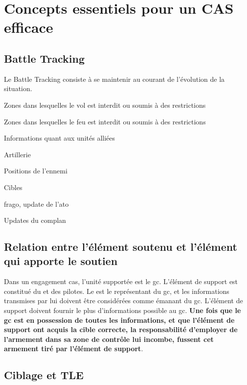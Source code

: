 \newpage
\section{Concepts essentiels pour un CAS efficace}


\subsection{Battle Tracking}

Le Battle Tracking consiste à se maintenir au courant de l'évolution de la situation.

\e
	\item Zones dans lesquelles le vol est interdit ou soumis à des restrictions
	\item Zones dans lesquelles le feu est interdit ou soumis à des restrictions
	\item Informations quant aux unités alliées
	\item Artillerie
	\item Positions de l'ennemi
	\item Cibles
	\item \gls{frago}, update de l'\gls{ato}
	\item Updates du \gls{complan}
\ed

\subsection{Relation entre l'élément soutenu et l'élément qui apporte le soutien}


Dans un engagement \gls{cas}, l'unité supportée est le \gls{gc}. L'élément de support est constitué du \ja{} et des pilotes. Le \ja{} est le représentant du \gls{gc}, et les informations transmises par lui doivent être considérées comme émanant du \gls{gc}. L'élément de support doivent fournir le plus d'informations possible au \gls{gc}. \textbf{Une fois que le \gls{gc} est en possession de toutes les informations, et que l'élément de support ont acquis la cible correcte, la responsabilité d'employer de l'armement dans sa zone de contrôle lui incombe, fussent cet armement tiré par l'élément de support}.

\subsection{Ciblage et TLE}

